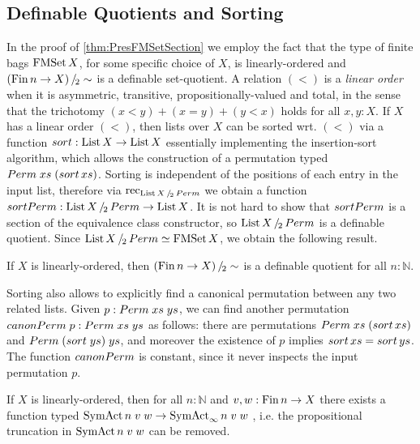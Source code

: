 \documentclass[final,a4paper,USenglish,cleveref]{lipics-v2021}
\begin{document}
\subsection{Definable Quotients and Sorting}\label{sec:Sorting}

In the proof of \cref{thm:PresFMSetSection} we employ the fact that the type of finite bags $\FMSet X$, for some specific choice of $X$, is linearly-ordered and $\SetQuot[(\Fin n \to X)][\sim]$ is a definable set-quotient.
A relation $(<)$ is a \emph{linear order} when it is asymmetric, transitive, propositionally-valued and total, in the sense that the trichotomy $(x < y) + (x = y) + (y < x)$ holds for all $x,y:X$.
If $X$ has a linear order $(<)$, then lists over $X$ can be sorted wrt. $(<)$ via a function $\sort : \List X \to \List X$ essentially implementing the insertion-sort algorithm, which allows the construction of a permutation typed $\Perm \;xs\;(\sort\,xs)$. Sorting is independent of the positions of each entry in the input list, therefore via $\Rec{\SetQuot[\List X][\Perm]}$ we obtain a function $\sortPerm : \SetQuot[\List X][\Perm] \to \List X$. It is not hard to show that $\sortPerm$ is a section of the equivalence class constructor, so $\SetQuot[\List X][\Perm]$ is a definable quotient.
Since $\SetQuot[\List X][\Perm] \simeq \FMSet X$, we obtain the following result.
\begin{proposition}\label{prop:ListPermDefQuot}
If $X$ is linearly-ordered, then $\SetQuot[(\Fin n \to X)][\sim]$ is a definable quotient for all $n : ℕ$.
\end{proposition}

Sorting also allows to explicitly find a canonical permutation between any two related lists. Given $p : \Perm \;xs\;ys$, we can find another permutation $\canonicalPerm \;p : \Perm\;xs\;ys$ as follows: there are permutations $\Perm\;xs\;(\sort\,xs)$ and $\Perm\;(\sort\;ys)\;ys$, and moreover the existence of $p$ implies $\sort\,xs = \sort\,ys$. The function $\canonicalPerm$ is constant, since it never inspects the input permutation $p$.
\begin{proposition}\label{prop:ListPermCanonicalPerm}
If $X$ is linearly-ordered, then for all $n : ℕ$ and $v,w : \Fin n \to X$ there exists a function typed $\SymAct n\; v\; w \to \SymActSigma n \;v \; w$ , i.e. the propositional truncation in $\SymAct n\; v\; w$ can be removed.
\end{proposition}
\end{document}
